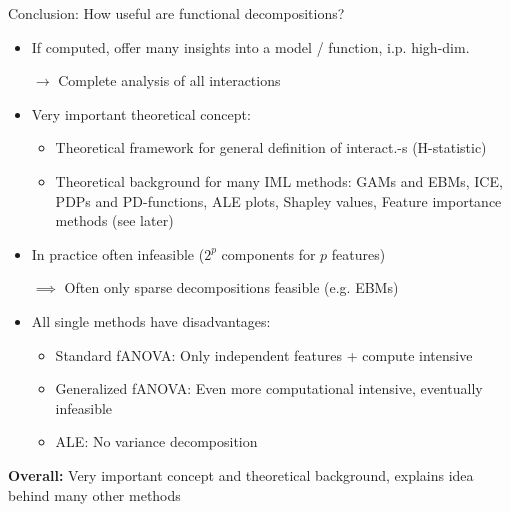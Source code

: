 \documentclass[10pt,compress,t,notes=noshow, xcolor=table]{beamer}
\begin{document}
\begin{frame}{Conclusion: How useful are functional decompositions?}
\begin{itemize}
        \item If computed, offer many insights into a model / function, i.p. high-dim.
        \item[$\rightarrow$] Complete analysis of all interactions
        \pause
        \item Very important theoretical concept:
        \begin{itemize}
            \item Theoretical framework for general definition of interact.-s (H-statistic)
            \item Theoretical background for many IML methods:
                GAMs and EBMs, 
                ICE, PDPs and PD-functions,
                ALE plots,
                Shapley values,
                Feature importance methods (see later)
        \end{itemize}
        \pause
        \item In practice often infeasible ($2^p$ components for $p$ features)
        \item[$\implies$] Often only sparse decompositions feasible (e.g. EBMs)
        \pause
        \item All single methods have disadvantages:
        \begin{itemize}
            \item Standard fANOVA: Only independent features + compute intensive
            \item Generalized fANOVA: Even more computational intensive, eventually infeasible
            \item ALE: No variance decomposition
        \end{itemize}
        
    \end{itemize}

    \pause
    \textbf{Overall:} Very important concept and theoretical background, explains idea behind many other methods
    
\end{frame}










\endlecture
\end{document}
